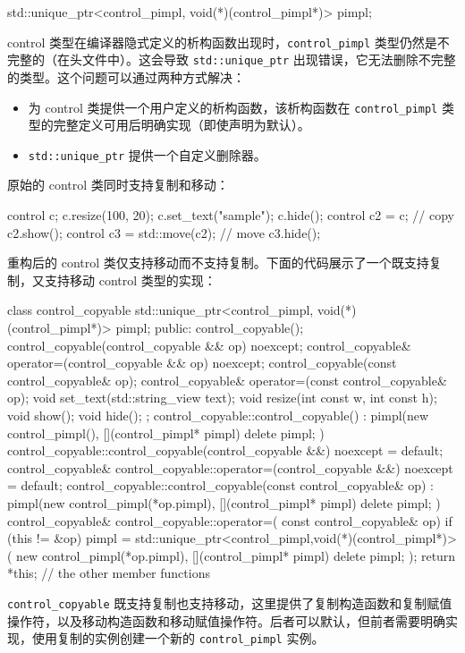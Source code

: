 \begin{cpp}
std::unique_ptr<control_pimpl, void(*)(control_pimpl*)> pimpl;
\end{cpp}

control 类型在编译器隐式定义的析构函数出现时，\verb|control_pimpl| 类型仍然是不完整的（在头文件中）。这会导致 \verb|std::unique_ptr| 出现错误，它无法删除不完整的类型。这个问题可以通过两种方式解决：

\begin{itemize}
\item
为 control 类提供一个用户定义的析构函数，该析构函数在 \verb|control_pimpl| 类型的完整定义可用后明确实现（即使声明为默认）。

\item
\verb|std::unique_ptr| 提供一个自定义删除器。
\end{itemize}


原始的 control 类同时支持复制和移动：

\begin{cpp}
control c;
c.resize(100, 20);
c.set_text("sample");
c.hide();
control c2 = c;             // copy
c2.show();
control c3 = std::move(c2); // move
c3.hide();
\end{cpp}

重构后的 control 类仅支持移动而不支持复制。下面的代码展示了一个既支持复制，又支持移动 control 类型的实现：

\begin{cpp}
class control_copyable
{
    std::unique_ptr<control_pimpl, void(*)(control_pimpl*)> pimpl;
public:
    control_copyable();
    control_copyable(control_copyable && op) noexcept;
    control_copyable& operator=(control_copyable && op) noexcept;
    control_copyable(const control_copyable& op);
    control_copyable& operator=(const control_copyable& op);
    void set_text(std::string_view text);
    void resize(int const w, int const h);
    void show();
    void hide();
};
control_copyable::control_copyable() :
    pimpl(new control_pimpl(),
        [](control_pimpl* pimpl) {delete pimpl; })
{}
control_copyable::control_copyable(control_copyable &&)
    noexcept = default;
control_copyable& control_copyable::operator=(control_copyable &&)
    noexcept = default;
control_copyable::control_copyable(const control_copyable& op)
    : pimpl(new control_pimpl(*op.pimpl),
        [](control_pimpl* pimpl) {delete pimpl; })
{}
control_copyable& control_copyable::operator=(
const control_copyable& op)
{
    if (this != &op)
    {
        pimpl = std::unique_ptr<control_pimpl,void(*)(control_pimpl*)>(
                new control_pimpl(*op.pimpl),
                [](control_pimpl* pimpl) {delete pimpl; });
    }
    return *this;
}
// the other member functions
\end{cpp}

\verb|control_copyable| 既支持复制也支持移动，这里提供了复制构造函数和复制赋值操作符，以及移动构造函数和移动赋值操作符。后者可以默认，但前者需要明确实现，使用复制的实例创建一个新的 \verb|control_pimpl| 实例。



